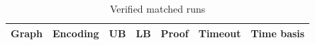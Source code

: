 \begin{table}[htbp]
\centering
\caption{Verified matched runs}
\label{tab:p1-Repeated-results}
\begin{tabular}{lllllll}
\hline
Graph & Encoding & UB & LB & Proof & Timeout & Time basis \\
\hline
\hline
\end{tabular}
\end{table}
